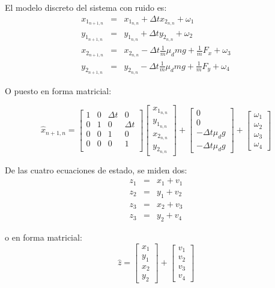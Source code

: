 El modelo discreto del sistema con ruido es:
\begin{eqnarray*}
x_{1_{n+1,n}} &=& x_{1_{n,n}} + \Delta t x_{2_{n,n}} + \omega_1\\ %
y_{1_{n+1,n}} &=& y_{1_{n,n}} + \Delta t y_{2_{n,n}} + \omega_2\\ %
x_{2_{n+1,n}} &=& x_{2_{n,n}} - \Delta t \frac{1}{m}\mu_d m g + \frac{1}{m} F_x + \omega_3\\ %
y_{2_{n+1,n}} &=& y_{2_{n,n}} - \Delta t \frac{1}{m}\mu_d m g + \frac{1}{m} F_y + \omega_4 %
\end{eqnarray*}

O puesto en forma matricial:

\begin{equation}
\hat{x}_{n+1,n} =
\begin{bmatrix}
1 & 0 & \Delta t & 0\\ 
0 & 1 & 0 & \Delta t\\
0 & 0 & 1 & 0\\
0 & 0 & 0 & 1\\
\end{bmatrix}
\begin{bmatrix}
x_{1_{n,n}}\\ 
y_{1_{n,n}}\\
x_{2_{n,n}}\\
y_{2_{n,n}}
\end{bmatrix}
+
\begin{bmatrix}
0 \\
0 \\
- \Delta t \mu_d g \\
- \Delta t \mu_d g 
\end{bmatrix}
+
\begin{bmatrix}
\omega_1 \\ 
\omega_2 \\
\omega_3 \\
\omega_4
\end{bmatrix}
\end{equation}	

De las cuatro ecuaciones de estado, se miden dos:
\begin{eqnarray*}
z_1 &=& x_1 + v_1\\
z_2 &=& y_1 + v_2\\
z_3 &=& x_2 + v_3\\
z_3 &=& y_2 + v_4
\end{eqnarray*}

o en forma matricial:
\begin{equation}
\hat{z} =
\begin{bmatrix}
x_1 \\ 
y_1\\
x_2\\
y_2
\end{bmatrix}
+
\begin{bmatrix}
v_1 \\ 
v_2\\
v_3\\
v_4
\end{bmatrix}
\end{equation}

